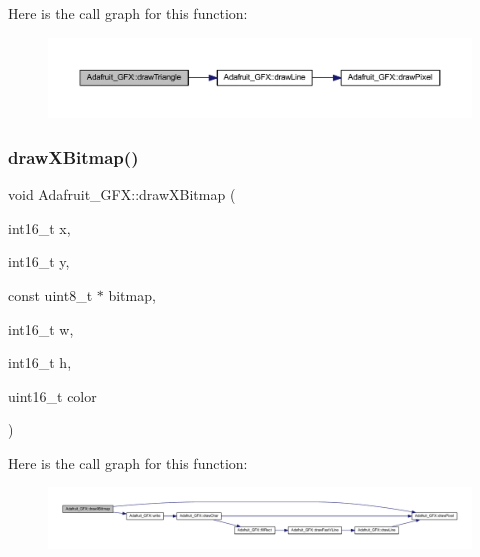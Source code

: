 Here is the call graph for this function\+:\nopagebreak
\begin{figure}[H]
\begin{center}
\leavevmode
\includegraphics[width=350pt]{class_adafruit___g_f_x_a49284b9cea16ecf8c15dfd0b51a841e6_cgraph}
\end{center}
\end{figure}
\mbox{\label{class_adafruit___g_f_x_acec26bcf41c15ac6826c67e1f5e4cde6}} 
\subsubsection{\texorpdfstring{draw\+X\+Bitmap()}{drawXBitmap()}}
{\footnotesize\ttfamily void Adafruit\+\_\+\+G\+F\+X\+::draw\+X\+Bitmap (\begin{DoxyParamCaption}\item[{int16\+\_\+t}]{x,  }\item[{int16\+\_\+t}]{y,  }\item[{const uint8\+\_\+t $\ast$}]{bitmap,  }\item[{int16\+\_\+t}]{w,  }\item[{int16\+\_\+t}]{h,  }\item[{uint16\+\_\+t}]{color }\end{DoxyParamCaption})}

Here is the call graph for this function\+:\nopagebreak
\begin{figure}[H]
\begin{center}
\leavevmode
\includegraphics[width=350pt]{class_adafruit___g_f_x_acec26bcf41c15ac6826c67e1f5e4cde6_cgraph}
\end{center}
\end{figure}
\mbox{\label{class_adafruit___g_f_x_a623e031e58492fb41e9fde6a05d97c12}} 
